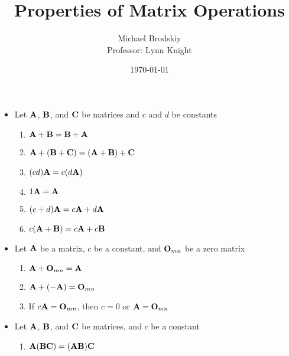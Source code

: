 \documentclass[12pt]{article}
\title{Properties of Matrix Operations}
\date{\today}
\author{Michael Brodskiy\\ \small Professor: Lynn Knight}
\begin{document}
\maketitle

\begin{itemize}

  \item Let $\bold{A}$, $\bold{B}$, and $\bold{C}$ be matrices and $c$ and $d$ be constants

    \begin{enumerate}

      \item $\bold{A}+\bold{B}=\bold{B}+\bold{A}$

      \item $\bold{A}+(\bold{B}+\bold{C})=(\bold{A}+\bold{B})+\bold{C}$

      \item $(cd)\bold{A}=c(d\bold{A})$

      \item $1\bold{A}=\bold{A}$

      \item $(c+d)\bold{A}=c\bold{A}+d\bold{A}$

      \item $c(\bold{A}+\bold{B})=c\bold{A}+c\bold{B}$

    \end{enumerate}

  \item Let $\bold{A}$ be a matrix, $c$ be a constant, and $\bold{O}_{mn}$ be a zero matrix

    \begin{enumerate}

      \item $\bold{A}+\bold{O}_{mn}=\bold{A}$

      \item $\bold{A} + (-\bold{A})=\bold{O}_{mn}$

      \item If $c\bold{A}=\bold{O}_{mn}$, then $c=0$ or $\bold{A}=\bold{O}_{mn}$

    \end{enumerate}

  \item Let $\bold{A}$, $\bold{B}$, and $\bold{C}$ be matrices, and $c$ be a constant

    \begin{enumerate}

      \item $\bold{A}(\bold{BC})=(\bold{AB})\bold{C}$


\end{enumerate}
\end{itemize}
\end{document}
